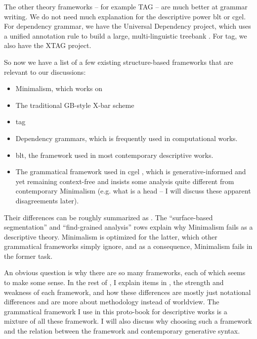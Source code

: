 \documentclass[../main.tex]{subfiles}
\begin{document}
The other theory frameworks -- for example TAG -- are much better at grammar writing. We do not need much explanation for 
the descriptive power \ac{blt} or \ac{cgel}. For dependency grammar, we have the Universal Dependency 
project, which uses a unified annotation rule to build a large, multi-linguistic treebank \citep{ud}.
For \ac{tag}, we also have the XTAG project. %

So now we have a list of a few existing structure-based frameworks that are relevant to our discussions:
\begin{itemize}
    \item Minimalism, which works on 
    \item The traditional GB-style X-bar scheme
    \item \ac{tag}  %
    \item Dependency grammars, which is frequently used in computational works.
    \item \ac{blt}, the framework used in most contemporary descriptive works.
    \item The grammatical framework used in \ac{cgel} \citep{cgel,pullum2008expressive}, which is generative-informed and yet remaining 
    context-free and insists some analysis quite different from contemporary Minimalism (e.g. 
    what is a head -- I will discuss these apparent disagreements later).
\end{itemize}
Their differences can be roughly summarized as . 
The ``surface-based segmentation'' and ``find-grained analysis'' rows explain why Minimalism fails as a 
descriptive theory. Minimalism is optimized for the latter, which other grammatical frameworks 
simply ignore, and as a consequence, Minimalism fails in the former task.

An obvious question is why there are so many frameworks, each of which seems to make some sense. 
In the rest of , I explain items in , the strength and weakness 
of each framework, and how these differences
are mostly just notational differences and are more about methodology instead of worldview. The grammatical framework I use in this proto-book for 
descriptive works is a mixture of all these framework. I will also discuss why choosing such a 
framework and the relation between the framework and contemporary generative syntax.


\end{document}
